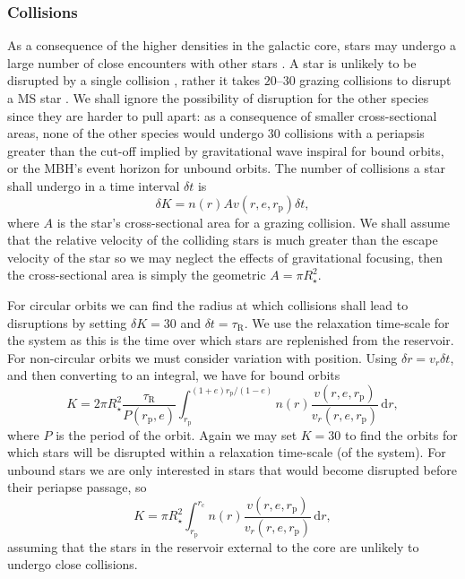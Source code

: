 \documentclass[useAMS,usedcolumn,usegraphicx,usenatbib]{mn2e}
\newcommand{\sub}[1]{\ensuremath{_\mathrm{#1}}}
\newcommand{\dd}{\ensuremath{\mathrm{d}}}
\newcommand{\intd}[4]{\ensuremath{\displaystyle \int_{#1}^{#2}{#3}\,\dd{#4}}}
\begin{document}
\subsubsection{Collisions}\label{sec:Collision}

As a consequence of the higher densities in the galactic core, stars may undergo a large number of close encounters with other stars \citep{Cohn1978}. A star is unlikely to be disrupted by a single collision \citep{Murphy1991,Freitag2005}, rather it takes $20$--$30$ grazing collisions to disrupt a MS star \citep{Freitag2006}. We shall ignore the possibility of disruption for the other species since they are harder to pull apart: as a consequence of smaller cross-sectional areas, none of the other species would undergo 30 collisions with a periapsis greater than the cut-off implied by gravitational wave inspiral for bound orbits, or the MBH's event horizon for unbound orbits. The number of collisions a star shall undergo in a time interval $\delta t$ is
\begin{equation}
\delta K = n(r) A v(r,e,r\sub{p})\delta t,
\end{equation}
where $A$ is the star's cross-sectional area for a grazing collision. We shall assume that the relative velocity of the colliding stars is much greater than the escape velocity of the star so we may neglect the effects of gravitational focusing, then the cross-sectional area is simply the geometric $A = \pi R_\star^2$.

For circular orbits we can find the radius at which collisions shall lead to disruptions by setting $\delta K = 30$ and $\delta t = \tau\sub{R}$. We use the relaxation time-scale for the system as this is the time over which stars are replenished from the reservoir. For non-circular orbits we must consider variation with position. Using $\delta r = v_r \delta t$, and then converting to an integral, we have for bound orbits
\begin{equation}
K = 2\pi R_\star^2 \frac{\tau\sub{R}}{P(r\sub{p},e)}\intd{r\sub{p}}{(1+e)r\sub{p}/(1-e)}{n(r)\frac{v(r,e,r\sub{p})}{v_r(r,e,r\sub{p})}}{r},
\end{equation}
where $P$ is the period of the orbit. Again we may set $K = 30$ to find the orbits for which stars will be disrupted within a relaxation time-scale (of the system). For unbound stars we are only interested in stars that would become disrupted before their periapse passage, so
\begin{equation}
K = \pi R_\star^2 \intd{r\sub{p}}{r\sub{c}}{n(r)\frac{v(r,e,r\sub{p})}{v_r(r,e,r\sub{p})}}{r},
\end{equation}
assuming that the stars in the reservoir external to the core are unlikely to undergo close collisions.
\end{document}
